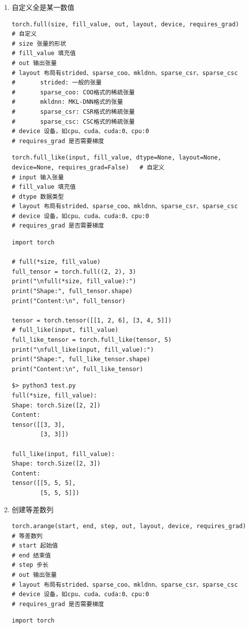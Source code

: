 \begin{enumerate}[label=\arabic*)]
\item 自定义全是某一数值
\begin{lstlisting}[style=demostyle,numbers=none]
torch.full(size, fill_value, out, layout, device, requires_grad)   # 自定义
# size 张量的形状
# fill_value 填充值
# out 输出张量
# layout 布局有strided、sparse_coo、mkldnn、sparse_csr、sparse_csc
#       strided: 一般的张量
#       sparse_coo: COO格式的稀疏张量
#       mkldnn: MKL-DNN格式的张量
#       sparse_csr: CSR格式的稀疏张量
#       sparse_csc: CSC格式的稀疏张量
# device 设备，如cpu、cuda、cuda:0、cpu:0
# requires_grad 是否需要梯度
\end{lstlisting}
\begin{lstlisting}[style=demostyle,numbers=none]
torch.full_like(input, fill_value, dtype=None, layout=None, device=None, requires_grad=False)   # 自定义
# input 输入张量
# fill_value 填充值
# dtype 数据类型
# layout 布局有strided、sparse_coo、mkldnn、sparse_csr、sparse_csc
# device 设备，如cpu、cuda、cuda:0、cpu:0
# requires_grad 是否需要梯度
\end{lstlisting}
\begin{lstlisting}[style=pythonstyle]
import torch

# full(*size, fill_value)
full_tensor = torch.full((2, 2), 3)
print("\nfull(*size, fill_value):")
print("Shape:", full_tensor.shape)
print("Content:\n", full_tensor)

tensor = torch.tensor([[1, 2, 6], [3, 4, 5]])
# full_like(input, fill_value)
full_like_tensor = torch.full_like(tensor, 5)
print("\nfull_like(input, fill_value):")
print("Shape:", full_like_tensor.shape)
print("Content:\n", full_like_tensor)
\end{lstlisting}
\begin{lstlisting}[style=demostyle,numbers=none]
$> python3 test.py
full(*size, fill_value):
Shape: torch.Size([2, 2])
Content:
tensor([[3, 3],
        [3, 3]])

full_like(input, fill_value):
Shape: torch.Size([2, 3])
Content:
tensor([[5, 5, 5],
        [5, 5, 5]])
\end{lstlisting}

\item 创建等差数列
\begin{lstlisting}[style=demostyle,numbers=none]
torch.arange(start, end, step, out, layout, device, requires_grad)   # 等差数列
# start 起始值
# end 结束值
# step 步长
# out 输出张量
# layout 布局有strided、sparse_coo、mkldnn、sparse_csr、sparse_csc
# device 设备，如cpu、cuda、cuda:0、cpu:0
# requires_grad 是否需要梯度
\end{lstlisting}
\begin{lstlisting}[style=pythonstyle]
import torch


\end{lstlisting}
\end{enumerate}
